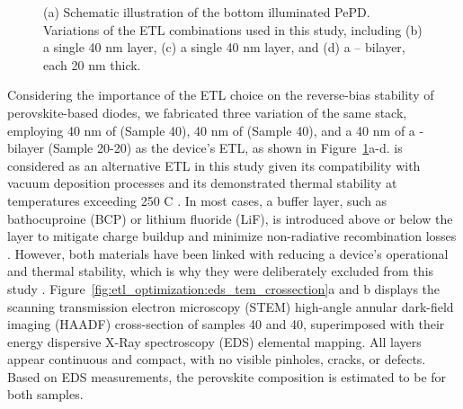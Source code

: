 \begin{figure}[htbp]
    \caption[Schematic illustration of ETL combinations used in this study.]{(a) Schematic illustration of the bottom illuminated PePD. Variations of the ETL combinations used in this study, including (b) a single 40 nm  layer, (c) a single 40 nm  layer, and (d) a  –  bilayer, each 20 nm thick.}
    \label{fig:etl_optimization:stacks}
\end{figure}

Considering the importance of the ETL choice on the reverse-bias stability of perovskite-based diodes, we fabricated three variation of the same stack, employing 40 nm of  (Sample 40), 40 nm of  (Sample 40), and a 40 nm of a - bilayer (Sample 20-20) as the device's ETL, as shown in Figure~\ref{fig:etl_optimization:stacks}a-d.  is considered as an alternative ETL in this study given its compatibility with vacuum deposition processes and its demonstrated thermal stability at temperatures exceeding 250 \degree C \cite{Sundar1992ThermalC60, Bracesco2024InPhotovoltaics}. In most cases, a buffer layer, such as bathocuproine (BCP) or lithium fluoride (LiF), is introduced above or below the  layer to mitigate charge buildup and minimize non-radiative recombination losses \cite{Chen2017EffectCells, Ye2022OvercomingCarborane}. However, both materials have been linked with reducing a device's operational and thermal stability, which is why they were deliberately excluded from this study \cite{Al-Ashouri2020MonolithicExtraction, Zheng2020EnhancedStrategy}. Figure~\ref{fig:etl_optimization:eds_tem_crossection}a and b displays the scanning transmission electron microscopy (STEM) high-angle annular dark-field imaging (HAADF) cross-section of samples 40 and 40, superimposed with their energy dispersive X-Ray spectroscopy (EDS) elemental mapping. All layers appear continuous and compact, with no visible pinholes, cracks, or defects. Based on EDS measurements, the perovskite composition is estimated to be  for both samples.


